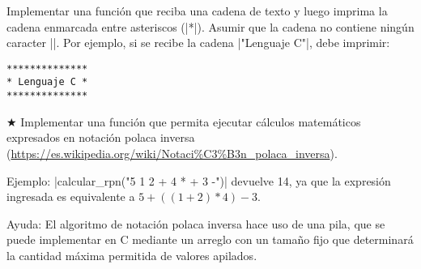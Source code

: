 \begin{ejercicio}
Implementar una función que reciba una cadena de texto y
luego imprima la cadena enmarcada entre asteriscos (|*|). Asumir que la cadena
no contiene ningún caracter |\n|. Por ejemplo, si se recibe la cadena
|"Lenguaje C"|, debe imprimir:

\begin{verbatim}
**************
* Lenguaje C *
**************
\end{verbatim}
\end{ejercicio}

\begin{ejercicio}
$\bigstar$ Implementar una función que permita ejecutar cálculos matemáticos
expresados en notación polaca inversa
(\url{https://es.wikipedia.org/wiki/Notaci%C3%B3n_polaca_inversa}).

Ejemplo: |calcular_rpn("5 1 2 + 4 * + 3 -")| devuelve 14, ya que la expresión
ingresada es equivalente a $5+((1+2)*4)-3$.

Ayuda: El algoritmo de notación polaca inversa hace uso de una pila,
que se puede implementar en C mediante un arreglo con un tamaño
fijo que determinará la cantidad máxima permitida de valores apilados.
\end{ejercicio}
